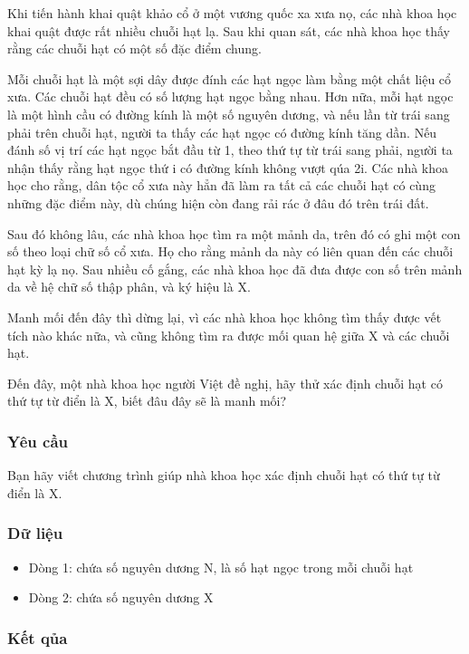 



   Khi tiến hành khai quật khảo cổ ở một vương quốc xa xưa nọ, các nhà khoa học khai quật được rất nhiều chuỗi hạt lạ. Sau khi quan sát, các nhà khoa học thấy rằng các chuỗi hạt có một số đặc điểm chung.  

   Mỗi chuỗi hạt là một sợi dây được đính các hạt ngọc làm bằng một chất liệu cổ xưa. Các chuỗi hạt đều có số lượng hạt ngọc bằng nhau. Hơn nữa, mỗi hạt ngọc là một hình cầu có đường kính là một số nguyên dương, và nếu lần từ trái sang phải trên chuỗi hạt, người ta thấy các hạt ngọc có đường kính tăng dần. Nếu đánh số vị trí các hạt ngọc bắt đầu từ 1, theo thứ tự từ trái sang phải, người ta nhận thấy rằng hạt ngọc thứ i có đường kính không vượt qúa 2i. Các nhà khoa học cho rằng, dân tộc cổ xưa này hẳn đã làm ra tất cả các chuỗi hạt có cùng những đặc điểm này, dù chúng hiện còn đang rải rác ở đâu đó trên trái đất.  

   Sau đó không lâu, các nhà khoa học tìm ra một mảnh da, trên đó có ghi một con số theo loại chữ số cổ xưa. Họ cho rằng mảnh da này có liên quan đến các chuỗi hạt kỳ lạ nọ. Sau nhiều cố gắng, các nhà khoa học đã đưa được con số trên mảnh da về hệ chữ số thập phân, và ký hiệu là X.  

   Manh mối đến đây thì dừng lại, vì các nhà khoa học không tìm thấy được vết tích nào khác nữa, và cũng không tìm ra được mối quan hệ giữa X và các chuỗi hạt.  

   Đến đây, một nhà khoa học người Việt đề nghị, hãy thử xác định chuỗi hạt có thứ tự từ điển là X, biết đâu đây sẽ là manh mối?  

\subsubsection{   Yêu cầu  }  Bạn hãy viết chương trình giúp nhà khoa học xác định chuỗi hạt có thứ tự từ điển là X.  

\subsubsection{   Dữ liệu  }
\begin{itemize}
	\item     Dòng 1: chứa số nguyên dương N, là số hạt ngọc trong mỗi chuỗi hạt   
	\item     Dòng 2: chứa số nguyên dương X   
\end{itemize}

\subsubsection{   Kết qủa  }

